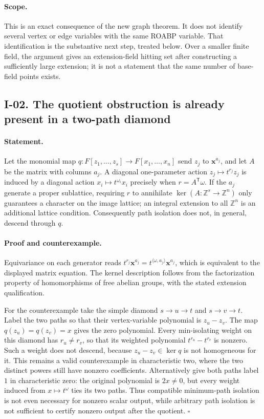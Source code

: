 \paragraph{Scope.}
This is an exact consequence of the new graph theorem.  It does not
identify several vertex or edge variables with the same ROABP variable.
That identification is the substantive next step, treated below.
Over a smaller finite field, the argument gives an extension-field
hitting set after constructing a sufficiently large extension; it is
not a statement that the same number of base-field points exists.

\subsection{I-02. The quotient obstruction is already present in a two-path diamond}
\label{I-02}

\paragraph{Statement.}
Let the monomial map $q:F[z_1,\ldots,z_s]\longrightarrow
F[x_1,\ldots,x_n]$ send $z_j$ to $\mathbf x^{a_j}$, and let $A$ be
the matrix with columns $a_j$.  A diagonal one-parameter action
$z_j\mapsto t^{r_j}z_j$ is induced by a diagonal action
$x_i\mapsto t^{\omega_i}x_i$ precisely when
$r=A^{\mathsf T}\omega$.  If the $a_j$ generate a proper sublattice,
requiring $r$ to annihilate $\ker(A:\mathbb Z^s\to\mathbb Z^n)$
only guarantees a character on the image lattice; an integral
extension to all $\mathbb Z^n$ is an additional lattice condition.
Consequently path isolation does not, in general, descend through $q$.

\paragraph{Proof and counterexample.}
Equivariance on each generator reads
$t^{r_j}\mathbf x^{a_j}=t^{\langle\omega,a_j\rangle}\mathbf x^{a_j}$,
which is equivalent to the displayed matrix equation.  The kernel
description follows from the factorization property of homomorphisms
of free abelian groups, with the stated extension qualification.

For the counterexample take the simple diamond
$s\to u\to t$ and $s\to v\to t$.  Label the two paths so that their
vertex-variable polynomial is $z_u-z_v$.  The map $q(z_u)=q(z_v)=x$
gives the zero polynomial.  Every min-isolating weight on this diamond
has $r_u\ne r_v$, so that its weighted polynomial
$t^{r_u}-t^{r_v}$ is nonzero.  Such a weight does not descend, because
$z_u-z_v\in\ker q$ is not homogeneous for it.  This remains a valid
counterexample in characteristic two, where the two distinct powers
still have nonzero coefficients.  Alternatively give both paths label
$1$ in characteristic zero: the original polynomial is $2x\ne0$,
but every weight induced from $x\mapsto t^{\omega}$ ties its two paths.
Thus compatible minimum-path isolation is not even necessary for
nonzero scalar output, while arbitrary path isolation is not sufficient
to certify nonzero output after the quotient. \hfill$\square$

